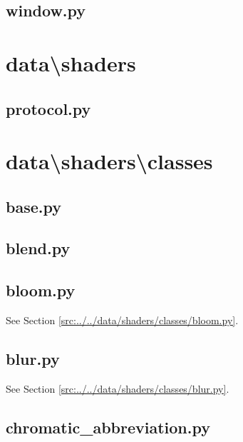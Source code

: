 \documentclass[../main/main.tex]{subfiles}
\begin{document}
\subsection{window.py}

\label{src:data/managers/window.py}

\section{data\textbackslash shaders}
\subsection{protocol.py}

\label{src:data/shaders/protocol.py}

\section{data\textbackslash shaders\textbackslash classes}
\subsection{base.py}

\label{src:data/shaders/classes/base.py}

\subsection{blend.py}

\label{src:data/shaders/classes/blend.py}

\subsection{bloom.py}
See Section \ref{src:../../data/shaders/classes/bloom.py}.

\subsection{blur.py}
See Section \ref{src:../../data/shaders/classes/blur.py}.

\subsection{chromatic\_abbreviation.py}

\label{src:data/shaders/classes/chromatic_abbreviation.py}
\end{document}
